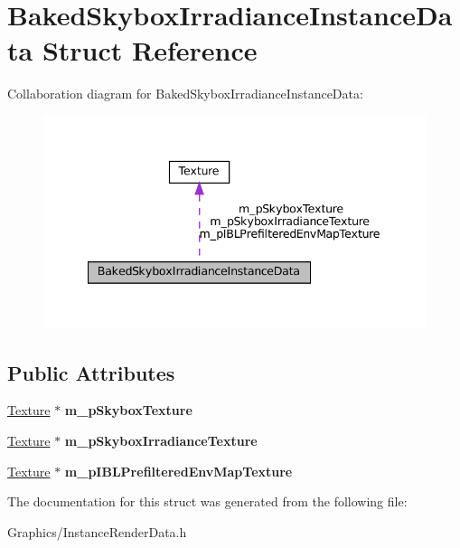 \hypertarget{structBakedSkyboxIrradianceInstanceData}{}\section{Baked\+Skybox\+Irradiance\+Instance\+Data Struct Reference}
\label{structBakedSkyboxIrradianceInstanceData}


Collaboration diagram for Baked\+Skybox\+Irradiance\+Instance\+Data\+:
\nopagebreak
\begin{figure}[H]
\begin{center}
\leavevmode
\includegraphics[width=340pt]{structBakedSkyboxIrradianceInstanceData__coll__graph}
\end{center}
\end{figure}
\subsection*{Public Attributes}
\begin{DoxyCompactItemize}
\item 
\mbox{\label{structBakedSkyboxIrradianceInstanceData_a10ffb1ec82b0032da7b632e87725117a}} 
\hyperlink{classTexture}{Texture} $\ast$ {\bfseries m\+\_\+p\+Skybox\+Texture}
\item 
\mbox{\label{structBakedSkyboxIrradianceInstanceData_abff80b70eb17d661cf39c5260eb21711}} 
\hyperlink{classTexture}{Texture} $\ast$ {\bfseries m\+\_\+p\+Skybox\+Irradiance\+Texture}
\item 
\mbox{\label{structBakedSkyboxIrradianceInstanceData_ad5a3b447d6cf3e8fb7363216b5c19043}} 
\hyperlink{classTexture}{Texture} $\ast$ {\bfseries m\+\_\+p\+I\+B\+L\+Prefiltered\+Env\+Map\+Texture}
\end{DoxyCompactItemize}


The documentation for this struct was generated from the following file\+:\begin{DoxyCompactItemize}
\item 
Graphics/Instance\+Render\+Data.\+h\end{DoxyCompactItemize}

